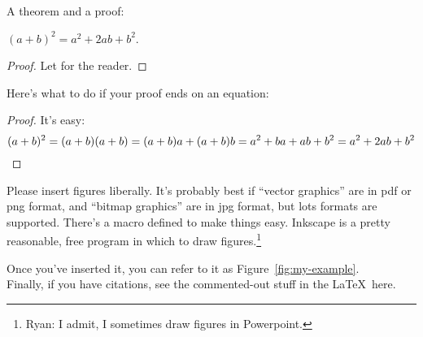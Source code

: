 A theorem and a proof:
\begin{theorem} $(a+b)^2 = a^2 + 2ab + b^2$.
\end{theorem}
\begin{proof}
Let for the reader.
\end{proof}

\bigskip

Here's what to do if your proof ends on an equation:
\begin{proof}
It's easy:
\[
    (a+b)^2 = (a+b)(a+b) = (a+b)a + (a+b)b = a^2 + ba + ab + b^2 = a^2 + 2ab + b^2 \qedhere
\]
\end{proof}

Please insert figures liberally.  It's probably best if ``vector graphics'' are in pdf or png format, and ``bitmap graphics'' are in jpg format, but lots formats are supported.  There's a macro defined to make things easy.  Inkscape is a pretty reasonable, free program in which to draw figures.\footnote{Ryan: I admit, I sometimes draw figures in Powerpoint.}
 
{}

Once you've inserted it, you can refer to it as Figure~\ref{fig:my-example}.\\

Finally, if you have citations, see the commented-out stuff in the \LaTeX~here.

%

